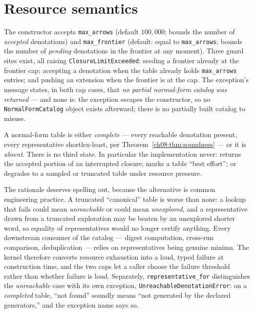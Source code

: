 \section{Resource semantics}\label{ch08:sec:resources}

\begin{construction}\label{ch08:con:resources}
The constructor accepts \texttt{max\_arrows} (default $100{,}000$; bounds
the number of \emph{accepted} denotations) and \texttt{max\_frontier}
(default: equal to \texttt{max\_arrows}; bounds the number of \emph{pending}
denotations in the frontier at any moment). Three guard sites exist, all
raising \texttt{ClosureLimitExceeded}: seeding a frontier already at the
frontier cap; accepting a denotation when the table already holds
\texttt{max\_arrows} entries; and pushing an extension when the frontier is
at the cap. The exception's message states, in both cap cases, that
\emph{no partial normal-form catalog was returned} --- and none is: the
exception escapes the constructor, so no \texttt{NormalFormCatalog} object
exists afterward; there is no partially built catalog to misuse.
\end{construction}

\begin{ruleenv}\label{ch08:rule:failclosed}
A normal-form table is either \emph{complete} --- every reachable
denotation present, every representative shortlex-least, per
Theorem~\ref{ch08:thm:soundness} --- or it is \emph{absent}. There is no
third state. In particular the implementation never: returns the accepted
portion of an interrupted closure; marks a table ``best effort''; or
degrades to a sampled or truncated table under resource pressure.
\end{ruleenv}

The rationale deserves spelling out, because the alternative is common
engineering practice. A truncated ``canonical'' table is worse than none: a
lookup that fails could mean \emph{unreachable} or could mean
\emph{unexplored}, and a representative drawn from a truncated exploration
may be beaten by an unexplored shorter word, so equality of representatives
would no longer certify anything. Every downstream consumer of the catalog
--- digest computation, cross-run comparison, deduplication --- relies on
representatives being genuine minima. The kernel therefore converts resource
exhaustion into a loud, typed failure at construction time, and the two caps
let a caller choose the failure threshold rather than whether failure is
loud. Separately, \texttt{representative\_for} distinguishes the
\emph{unreachable} case with its own exception,
\texttt{UnreachableDenotationError}: on a \emph{completed} table,
``not found'' soundly means ``not generated by the declared generators,''
and the exception name says so.

